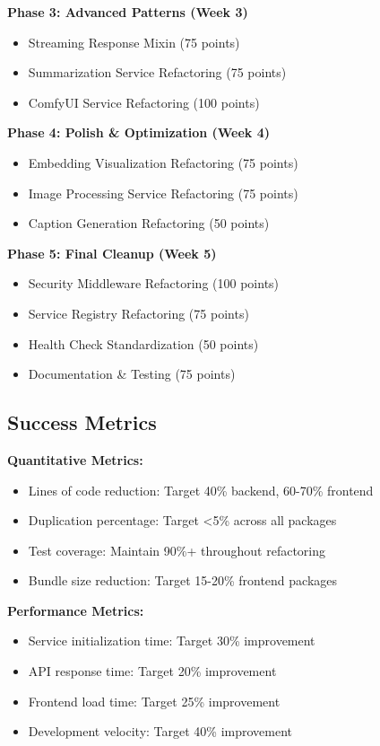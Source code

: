 \documentclass[10pt]{article}
\begin{document}
\textbf{Phase 3: Advanced Patterns (Week 3)}
\begin{itemize}
    \item Streaming Response Mixin (75 points)
    \item Summarization Service Refactoring (75 points)
    \item ComfyUI Service Refactoring (100 points)
\end{itemize}

\textbf{Phase 4: Polish \& Optimization (Week 4)}
\begin{itemize}
    \item Embedding Visualization Refactoring (75 points)
    \item Image Processing Service Refactoring (75 points)
    \item Caption Generation Refactoring (50 points)
\end{itemize}

\textbf{Phase 5: Final Cleanup (Week 5)}
\begin{itemize}
    \item Security Middleware Refactoring (100 points)
    \item Service Registry Refactoring (75 points)
    \item Health Check Standardization (50 points)
    \item Documentation \& Testing (75 points)
\end{itemize}

\subsection{Success Metrics}

\textbf{Quantitative Metrics:}
\begin{itemize}
    \item Lines of code reduction: Target 40\% backend, 60-70\% frontend
    \item Duplication percentage: Target <5\% across all packages
    \item Test coverage: Maintain 90\%+ throughout refactoring
    \item Bundle size reduction: Target 15-20\% frontend packages
\end{itemize}

\textbf{Performance Metrics:}
\begin{itemize}
    \item Service initialization time: Target 30\% improvement
    \item API response time: Target 20\% improvement
    \item Frontend load time: Target 25\% improvement
    \item Development velocity: Target 40\% improvement
\end{itemize}
\end{document}
